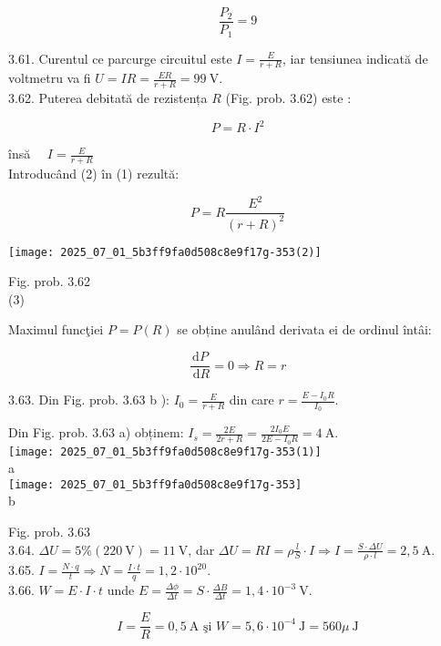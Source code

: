 $$
\frac{P_{2}}{P_{1}}=9
$$

3.61. Curentul ce parcurge circuitul este $I=\frac{E}{r+R}$, iar tensiunea indicată de voltmetru va fi $U=I R=\frac{E R}{r+R}=99 \mathrm{~V}$.\\
3.62. Puterea debitată de rezistența $R$ (Fig. prob. 3.62) este :


\begin{equation*}
P=R \cdot I^{2} \tag{1}
\end{equation*}


însă $\quad I=\frac{E}{r+R}$\\
Introducând (2) în (1) rezultă:

$$
P=R \frac{E^{2}}{(r+R)^{2}}
$$

\begin{center}
\texttt{[image: 2025\_07\_01\_5b3ff9fa0d508c8e9f17g-353(2)]}
\end{center}

Fig. prob. 3.62\\
(3)

Maximul funcţiei $P=P(R)$ se obține anulând derivata ei de ordinul întâi:

$$
\frac{\mathrm{d} P}{\mathrm{~d} R}=0 \Rightarrow R=r
$$

3.63. Din Fig. prob. 3.63 b ): $I_{0}=\frac{E}{r+R}$ din care $r=\frac{E-I_{0} R}{I_{0}}$.

Din Fig. prob. 3.63 a) obținem: $I_{s}=\frac{2 E}{2 r+R}=\frac{2 I_{0} E}{2 E-I_{0} R}=4 \mathrm{~A}$.\\
\texttt{[image: 2025\_07\_01\_5b3ff9fa0d508c8e9f17g-353(1)]}\\
a\\
\texttt{[image: 2025\_07\_01\_5b3ff9fa0d508c8e9f17g-353]}\\
b

Fig. prob. 3.63\\
3.64. $\Delta U=5 \%(220 \mathrm{~V})=11 \mathrm{~V}$, dar $\Delta U=R I=\rho \frac{l}{S} \cdot I \Rightarrow I=\frac{S \cdot \Delta U}{\rho \cdot l}=2,5 \mathrm{~A}$.\\
3.65. $I=\frac{N \cdot q}{t} \Rightarrow N=\frac{I \cdot t}{q}=1,2 \cdot 10^{20}$.\\
3.66. $W=E \cdot I \cdot t$ unde $E=\frac{\Delta \phi}{\Delta t}=S \cdot \frac{\Delta B}{\Delta t}=1,4 \cdot 10^{-3} \mathrm{~V}$.

$$
I=\frac{E}{R}=0,5 \mathrm{~A} \text { şi } W=5,6 \cdot 10^{-4} \mathrm{~J}=560 \mu \mathrm{~J}
$$

